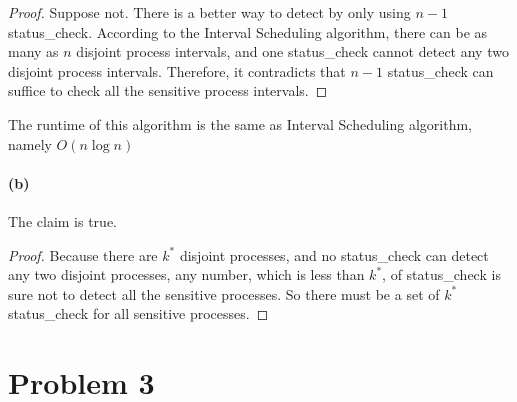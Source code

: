 \documentclass[letter,12pt]{article}
\begin{document}
\begin{proof}
Suppose not. There is a better way to detect by only using $n-1$ 
\textsf{status\_check}. According to the Interval Scheduling algorithm,
there can be as many as $n$ disjoint process intervals, and one 
\textsf{status\_check} cannot detect any two disjoint process intervals.
Therefore, it contradicts that $n-1$ \textsf{status\_check} can suffice 
to check all the sensitive process intervals.
\end{proof}

The runtime of this algorithm is the same as Interval Scheduling 
algorithm, namely $O(n\log n)$

\paragraph*{(b)}
The claim is true.
\begin{proof}
Because there are $k^*$ disjoint processes, and no 
\textsf{status\_check} can detect any two disjoint processes, any
number, which is less than $k^*$, of \textsf{status\_check} is sure
not to detect all the sensitive processes. So there must be a set of
$k^*$ \textsf{status\_check} for all sensitive processes.
\end{proof}

\section*{Problem 3}
\end{document}
